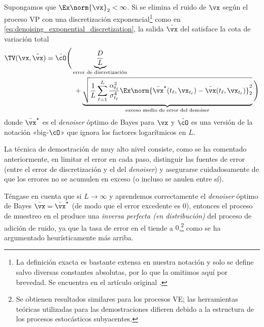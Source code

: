 \documentclass[../../book-main.tex]{subfiles}
\begin{document}
\begin{theorem}\label{thm:diffusion_sampler_convergence}
    Supongamos que \(\Ex\norm{\vx}_{2} < \infty\). Si se elimina el ruido de \(\vx\) 
    según el proceso VP con una discretización
    exponencial\footnote{La definición exacta es bastante extensa
        en nuestra notación y solo se define salvo diversas
        constantes absolutas, por lo que la omitimos aquí por brevedad. Se encuentra en el
    artículo original \citep{li2024d}.} como en
    \eqref{eq:denoising_exponential_discretization}, la salida
    \(\hat{\vx}\) del  satisface la
    cota de variación total
    \begin{align}\label{eq:diffusion_sampling_error}
        \TV(\vx, \hat{\vx})
        &= \tilde{\cO}\Bigg(\underbrace{\frac{D}{L}}_{\text{error de discretización}} \\
            & \qquad \qquad + \underbrace{\sqrt{\frac{1}{L}\sum_{\ell =
                    1}^{L}\frac{\alpha_{t_{\ell}}^{2}}{\sigma_{t_{\ell}}^{4}}\Ex\norm{\bar{\vx}^{\star}(t_{\ell},
                        \vx_{t_{\ell}}) - \bar{\vx}(t_{\ell},
            \vx_{t_{\ell}})}_{2}^{2}}}_{\text{exceso medio de error del denoiser}}\Bigg)\nonumber
    \end{align}
    donde \(\bar{\vx}^{\star}\) es el \textit{denoiser} óptimo de Bayes para
    \(\vx\) y \(\tilde{\cO}\) es una versión de la notación «big-\(\cO\)»
    que ignora los factores logarítmicos en \(L\).
\end{theorem}
La técnica de demostración de muy alto nivel consiste, como se ha comentado anteriormente, en
limitar el error en cada paso, distinguir las fuentes de error (entre
el error de discretización y el del \textit{denoiser}) y asegurarse cuidadosamente de que
los errores no se acumulen en exceso (o incluso se anulen entre sí).

Téngase en cuenta que si \(L \to \infty\) y aprendemos correctamente el \textit{denoiser} óptimo de Bayes
\(\bar{\vx} = \bar{\vx}^{\star}\) (de modo que el error excedente es
\(0\)), entonces el proceso de muestreo en el
 produce una \textit{inversa perfecta (en
distribución)} del proceso de adición de ruido, ya que la tasa de error en el
 tiende a
\(0\),\footnote{Se obtienen resultados similares para los procesos VE; las
    herramientas teóricas utilizadas para las demostraciones difieren debido a la estructura de los
procesos estocásticos subyacentes.} como se ha argumentado heurísticamente más arriba.
\end{document}
